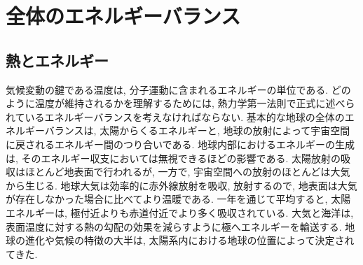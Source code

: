 \documentclass[a4j,12pt,openbib,oneside,dvipdfmx]{jbook}
\begin{document}
\chapter{全体のエネルギーバランス}	
\section{熱とエネルギー}
\par
気候変動の鍵である温度は, 分子運動に含まれるエネルギーの単位である. どのように温度が維持されるかを理解するためには, 熱力学第一法則で正式に述べられているエネルギーバランスを考えなければならない. 
基本的な地球の全体のエネルギーバランスは, 太陽からくるエネルギーと, 地球の放射によって宇宙空間に戻されるエネルギー間のつり合いである. 地球内部におけるエネルギーの生成は, そのエネルギー収支においては無視できるほどの影響である. 
太陽放射の吸収はほとんど地表面で行われるが, 一方で, 宇宙空間への放射のほとんどは大気から生じる. 地球大気は効率的に赤外線放射を吸収, 放射するので, 地表面は大気が存在しなかった場合に比べてより温暖である. 
一年を通じて平均すると, 太陽エネルギーは, 極付近よりも赤道付近でより多く吸収されている. 大気と海洋は, 表面温度に対する熱の勾配の効果を減らすように極へエネルギーを輸送する. 地球の進化や気候の特徴の大半は, 太陽系内における地球の位置によって決定されてきた.
\end{document}
